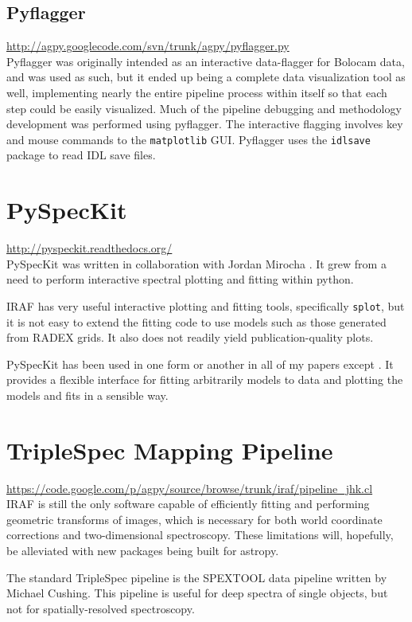 \subsection{Pyflagger}
\url{http://agpy.googlecode.com/svn/trunk/agpy/pyflagger.py}\\
Pyflagger was originally intended as an interactive data-flagger for Bolocam
data, and was used as such, but it ended up being a complete data visualization
tool as well, implementing nearly the entire pipeline process within itself so
that each step could be easily visualized.  Much of the pipeline debugging and
methodology development was performed using pyflagger.  The interactive
flagging involves key and mouse commands to the \texttt{matplotlib} GUI.
Pyflagger uses the \texttt{idlsave} package to read IDL save files.

\section{PySpecKit}
\url{http://pyspeckit.readthedocs.org/} \\
PySpecKit was written in collaboration with Jordan Mirocha \citep{Ginsburg2011c}.
It grew from a need to perform interactive spectral plotting and fitting within python.

IRAF has very useful interactive plotting and fitting tools, specifically
\texttt{splot}, but it is not easy to extend the fitting code to use models
such as those generated from RADEX grids.  It also does not readily yield
publication-quality plots.

PySpecKit has been used in one form or another in all of my papers except
\citet{Ginsburg2012a}.  It provides a flexible interface for fitting
arbitrarily models to data and plotting the models and fits in a sensible way.

\section{TripleSpec Mapping Pipeline}
\url{https://code.google.com/p/agpy/source/browse/trunk/iraf/pipeline_jhk.cl} \\
IRAF is still the only software capable of efficiently fitting and performing
geometric transforms of images, which is necessary for both world coordinate
corrections and two-dimensional spectroscopy.  These limitations will, hopefully,
be alleviated with new packages being built for astropy.

The standard TripleSpec pipeline is the SPEXTOOL data pipeline written by Michael
Cushing.  This pipeline is useful for deep spectra of single objects, but not
for spatially-resolved spectroscopy.

